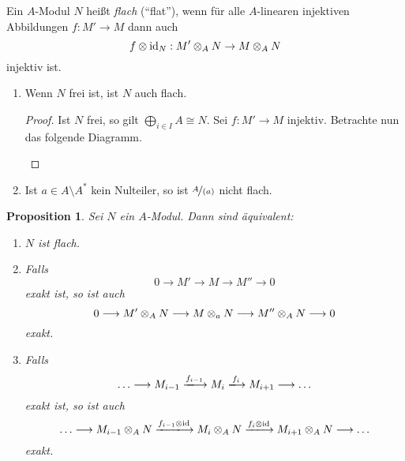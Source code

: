 \documentclass[12pt,a4paper]{scrartcl}
\theoremstyle{cplain}
\newtheorem{prop}[thmcounter]{Proposition}
\theoremstyle{cdef}
\begin{document}
\begin{defi}
	Ein $A$-Modul $N$ heißt \emph{flach} (\enquote{flat}), wenn für alle $A$-linearen injektiven Abbildungen $f: M' \to M$ dann auch \[ f \otimes \operatorname{id}_N : M' \otimes_A N \to M \otimes_A N \] injektiv ist.
\end{defi}
\begin{bsp}
	\leavevmode
	\begin{enumerate}
		\item Wenn $N$ frei ist, ist $N$ auch flach.
		\begin{proof}
			Ist $N$ frei, so gilt $\bigoplus_{i \in I} A \cong N$. Sei $f: M' \to M$ injektiv. Betrachte nun das folgende Diagramm.
			\begin{figure}[H]
				\centering
			\end{figure}
		\end{proof}
		\item Ist $a \in A \setminus A^*$ kein Nulteiler, so ist $\nicefrac{A}{(a)}$ nicht flach.
	\end{enumerate}
\end{bsp}
\begin{prop}
	Sei $N$ ein $A$-Modul. Dann sind äquivalent:
	\begin{enumerate}
		\item $N$ ist flach. \label{prop:flach:i}
		\item Falls \[ 0 \longrightarrow M' \longrightarrow M \longrightarrow M'' \longrightarrow 0 \] exakt ist, so ist auch \[ 0 \longrightarrow M' \otimes_A N \longrightarrow M \otimes_a N \longrightarrow M'' \otimes_A N \longrightarrow 0 \] exakt. \label{prop:flach:ii}
		\item Falls \[ \ldots \longrightarrow M_{i-1} \xlongrightarrow{f_{i-1}} M_i \xlongrightarrow{f_{i}} M_{i+1} \longrightarrow \ldots \] exakt ist, so ist auch \[ \ldots \longrightarrow M_{i-1}\tp_A N \xlongrightarrow{f_{i-1}\tp\id} M_i\tp_A N \xlongrightarrow{f_{i}\tp\id} M_{i+1}\tp_A N \longrightarrow \ldots \] exakt. \label{prop:flach:iii}
	\end{enumerate}
\end{prop}
\end{document}
